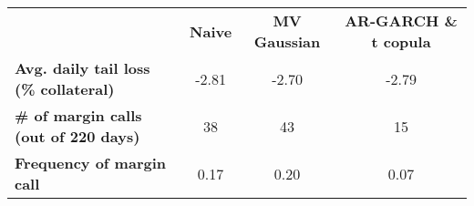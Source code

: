 \begin{small}\begin{tabular}{ l c c c }
&\textbf{Naive}&\textbf{MV Gaussian}&\textbf{AR-GARCH \& t copula}\\
\textbf{Avg. daily tail loss (\% collateral)}&-2.81&-2.70&-2.79\\
\textbf{\# of margin calls (out of 220 days)}&38&43&15\\
\textbf{Frequency of margin call}&0.17&0.20&0.07\\
\end{tabular}
\end{small}
